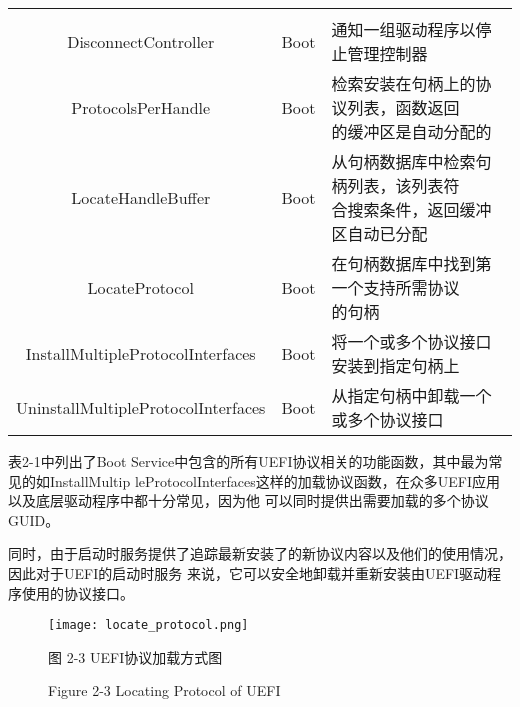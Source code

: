 \begin{table}[htb]
\begin{tabular*}{\hsize}{@{}@{\extracolsep{\fill}}ccl@{}}
{                                        }\\
    DisconnectController       &Boot  &\quad 通知一组驱动程序以停止管理控制器\\
    ProtocolsPerHandle         &Boot  &\makecell[l]{
                                       \quad 检索安装在句柄上的协议列表，函数返回\\
                                             的缓冲区是自动分配的
                                        }\\
    LocateHandleBuffer         &Boot  &\makecell[l]{
                                       \quad 从句柄数据库中检索句柄列表，该列表符\\
                                             合搜索条件，返回缓冲区自动已分配
                                        }\\
    LocateProtocol             &Boot  &\makecell[l]{
                                       \quad 在句柄数据库中找到第一个支持所需协议\\
                                             的句柄\\
                                        }\\
    InstallMultipleProtocolInterfaces
                               &Boot  &\quad 将一个或多个协议接口安装到指定句柄上\\
    UninstallMultipleProtocolInterfaces
                               &Boot  &\quad 从指定句柄中卸载一个或多个协议接口\\
	\bottomrule[0.75pt]
    \end{tabular*}
	\vspace{-0.3cm}
\end{table}

表2-1中列出了Boot Service中包含的所有UEFI协议相关的功能函数，其中最为常见的如InstallMultip
leProtocolInterfaces这样的加载协议函数，在众多UEFI应用以及底层驱动程序中都十分常见，因为他
可以同时提供出需要加载的多个协议GUID。
\par 同时，由于启动时服务提供了追踪最新安装了的新协议内容以及他们的使用情况，因此对于UEFI的启动时服务
来说，它可以安全地卸载并重新安装由UEFI驱动程序使用的协议接口。

\begin{figure}[htb]
    \vspace{0cm}   
    \setlength{\abovecaptionskip}{0.3cm}  
	\centering
    \texttt{[image: locate\_protocol.png]}
    \caption*{图 2-3 UEFI协议加载方式图}
    \setlength{\belowcaptionskip}{-0.7cm}
    \caption*{Figure 2-3 Locating Protocol of UEFI}
\end{figure}

